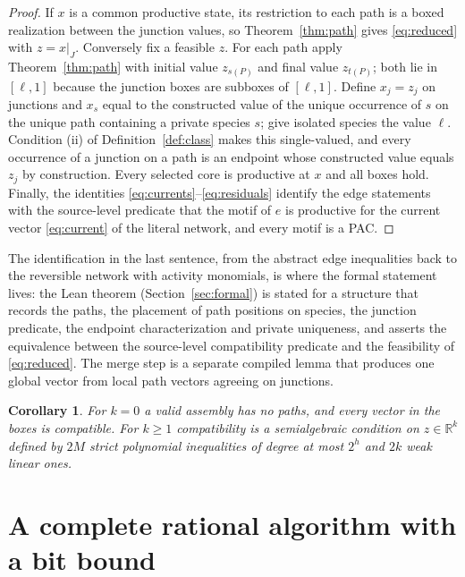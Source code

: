 \documentclass[11pt,a4paper]{article}
\theoremstyle{plain}
\newtheorem{corollary}[theorem]{Corollary}
\theoremstyle{definition}
\theoremstyle{remark}
\newcommand{\R}{\mathbb{R}}
\begin{document}
\begin{proof}
If $x$ is a common productive state, its restriction to each path is a boxed realization between the junction values, so Theorem~\ref{thm:path} gives \eqref{eq:reduced} with $z=x|_J$. Conversely fix a feasible $z$. For each path apply Theorem~\ref{thm:path} with initial value $z_{s(P)}$ and final value $z_{t(P)}$; both lie in $[\ell,1]$ because the junction boxes are subboxes of $[\ell,1]$. Define $x_j=z_j$ on junctions and $x_s$ equal to the constructed value of the unique occurrence of $s$ on the unique path containing a private species $s$; give isolated species the value $\ell$. Condition (ii) of Definition~\ref{def:class} makes this single-valued, and every occurrence of a junction on a path is an endpoint whose constructed value equals $z_j$ by construction. Every selected core is productive at $x$ and all boxes hold. Finally, the identities \eqref{eq:currents}--\eqref{eq:residuals} identify the edge statements with the source-level predicate that the motif of $e$ is productive for the current vector \eqref{eq:current} of the literal network, and every motif is a PAC.
\end{proof}

The identification in the last sentence, from the abstract edge inequalities back to the reversible network with activity monomials, is where the formal statement lives: the Lean theorem  (Section~\ref{sec:formal}) is stated for a structure that records the paths, the placement of path positions on species, the junction predicate, the endpoint characterization and private uniqueness, and asserts the equivalence between the source-level compatibility predicate and the feasibility of \eqref{eq:reduced}. The merge step is a separate compiled lemma that produces one global vector from local path vectors agreeing on junctions.

\begin{corollary}\label{cor:real}
For $k=0$ a valid assembly has no paths, and every vector in the boxes is compatible. For $k\ge1$ compatibility is a semialgebraic condition on $z\in\R^k$ defined by $2M$ strict polynomial inequalities of degree at most $2^h$ and $2k$ weak linear ones.
\end{corollary}

\section{A complete rational algorithm with a bit bound}\label{sec:algorithm}
\end{document}

